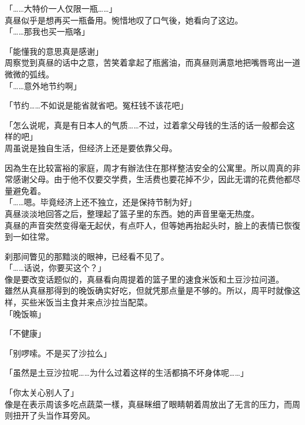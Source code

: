 「……大特价一人仅限一瓶……」\\

真昼似乎是想再买一瓶备用。惋惜地叹了口气後，她看向了这边。\\

「……那我也买一瓶咯」

「能懂我的意思真是感谢」\\

周察觉到真昼的话中之意，苦笑着拿起了瓶酱油，而真昼则满意地把嘴唇弯出一道微微的弧线。\\

「……意外地节约啊」

「节约……不如说是能省就省吧。冤枉钱不该花吧」

「怎么说呢，真是有日本人的气质……不过，过着拿父母钱的生活的话一般都会这样的吧」\\

周虽说是独自生活，但经济上还是要依靠父母。

因為生在比较富裕的家庭，周才有辦法住在那样整洁安全的公寓里。所以周真的非常感谢父母。由于他不仅要交学费，生活费也要花掉不少，因此无谓的花费他都尽量避免着。\\

「……嗯。毕竟经济上还不独立，还是保持节制为好」\\

真昼淡淡地回答之后，整理起了篮子里的东西。她的声音里毫无热度。\\

真昼的声音突然变得毫无起伏，有点吓人，但等她再抬起头时，臉上的表情已恢復到一如往常。

刹那间瞥见的那黯淡的眼神，已经看不见了。\\

「……话说，你要买这个？」\\

像是要改变话题似的，真昼看向周提着的篮子里的速食米饭和土豆沙拉问道。\\

雖然从真昼那得到的晚饭确实好吃，但就凭那点量是不够的。所以，周平时就像这样，买些米饭当主食并来点沙拉当配菜。\\

「晚饭嘛」

「不健康」

「别啰嗦。不是买了沙拉么」

「虽然是土豆沙拉呢……为什么过着这样的生活都搞不坏身体呢……」

「你太关心别人了」\\

像是在表示周该多吃点蔬菜一樣，真昼眯细了眼睛朝着周放出了无言的压力，而周则扭开了头当作耳旁风。\\

